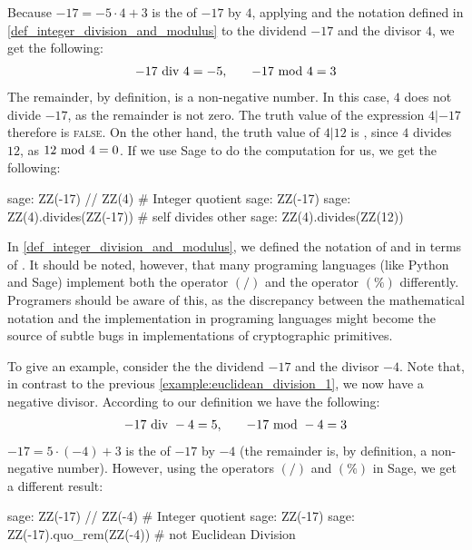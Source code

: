 \begin{example}
\label{example:euclidean_division_1}
 Because $ -17 = -5 \cdot 4 + 3 $  is the  of $-17$ by $4$, applying  and the notation defined in \ref{def_integer_division_and_modulus} to the dividend $-17$ and the divisor $4$, we get the following:
\begin{equation}
\begin{array}{lcr}
-17 \text{ div } 4 = - 5, & & -17 \text{ mod } 4 = 3
\end{array}
\end{equation}
The remainder, by definition, is a non-negative number. In this case, $4$ does not divide $-17$, as the remainder is not zero. The truth value of the expression $4 | -17 $ therefore is \textsc{false}. On the other hand, the truth value of $4 | 12$ is , since $4$ divides $12$, as $ 12 \text{ mod } 4 = 0 $. If we use  Sage to do the computation for us, we get the following:
\begin{sagecommandline}
sage: ZZ(-17) // ZZ(4) # Integer quotient
sage: ZZ(-17) %
sage: ZZ(4).divides(ZZ(-17)) # self divides other
sage: ZZ(4).divides(ZZ(12))
\end{sagecommandline}
\end{example}
\begin{remark} In \ref{def_integer_division_and_modulus}, we defined the notation of   and  in terms of . It should be noted, however, that many programing languages (like Python and  Sage) implement both the operator $(/)$ and the operator $(\%)$ differently. Programers should be aware of this, as the discrepancy between the mathematical notation and the implementation in programing languages might become the source of subtle bugs in implementations of cryptographic primitives.

To give an example, consider the the dividend $-17$ and the divisor $-4$. Note that, in contrast to the previous \examplename{} \ref{example:euclidean_division_1}, we now have a negative divisor. According to our definition we have the following:
\begin{equation}\label{euclidean-negative}
\begin{array}{lcr}
-17 \text{ div } -4 = 5, & & -17 \text{ mod } -4 = 3
\end{array}
\end{equation}
$ -17 = 5 \cdot (-4) + 3 $  is the  of $-17$ by $-4$ (the remainder is, by definition, a non-negative number). However, using the operators $(/)$ and $(\%)$ in  Sage, we get a different result: 

\begin{sagecommandline}
sage: ZZ(-17) // ZZ(-4) # Integer quotient
sage: ZZ(-17) %
sage: ZZ(-17).quo_rem(ZZ(-4)) # not Euclidean Division
\end{sagecommandline}
\end{remark}

